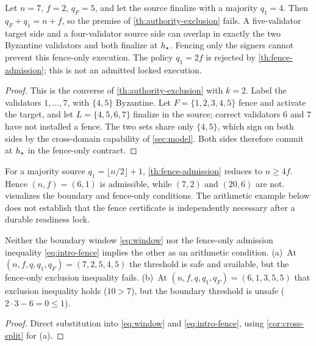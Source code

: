 \begin{corollary}
\label{cor:cross-split}
Let $n=7$, $f=2$, $q_F=5$, and let the source finalize with a majority $q_1=4$. Then $q_F+q_1=n+f$,
so the premise of \cref{th:authority-exclusion} fails. A five-validator target side and a
four-validator source side can overlap in exactly the two Byzantine validators and both finalize at
$h_{\star}$. Fencing only the \FenceCert{} signers cannot prevent this fence-only execution. The policy
$q_1=2f$ is rejected by \cref{th:fence-admission}; this is not an admitted locked execution.
\end{corollary}
\begin{proof}
This is the converse of \cref{th:authority-exclusion} with $k=2$. Label the validators
$1,\ldots,7$, with $\{4,5\}$ Byzantine. Let $F=\{1,2,3,4,5\}$ fence and activate the
target, and let $L=\{4,5,6,7\}$ finalize in the source; correct validators $6$ and $7$ have not
installed a fence. The two sets share only $\{4,5\}$, which sign on both sides by the cross-domain
capability of \cref{sec:model}. Both sides therefore commit at $h_{\star}$ in the fence-only contract.
\end{proof}

For a majority source $q_1=\lfloor n/2\rfloor+1$, \cref{th:fence-admission} reduces to $n\ge4f$.
Hence $(n,f)=(6,1)$ is admissible, while $(7,2)$ and $(20,6)$ are not.  visualizes
the boundary and fence-only conditions. The arithmetic example below does not establish that the
fence certificate is independently necessary after a durable readiness lock.

\begin{proposition}
\label{prop:independence}
Neither the boundary window \eqref{eq:window} nor the fence-only admission inequality
\eqref{eq:intro-fence} implies the other as an arithmetic condition. (a)~At
$(n,f,q,q_1,q_F)=(7,2,5,4,5)$ the \CutCert{} threshold is safe and available, but the fence-only
exclusion inequality fails. (b)~At $(n,f,q,q_1,q_F)=(6,1,3,5,5)$ that exclusion inequality holds
($10>7$), but the boundary threshold is unsafe ($2\cdot3-6=0\le1$).
\end{proposition}
\begin{proof}
Direct substitution into \eqref{eq:window} and \eqref{eq:intro-fence}, using \cref{cor:cross-split}
for (a).
\end{proof}


